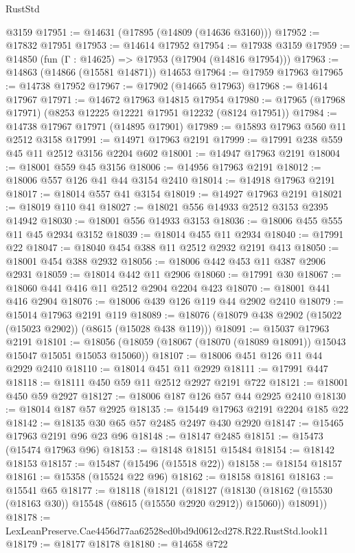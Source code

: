 \begin{lexlean}{RustStd}
\begin{coremodule}
    @3159
@17951 := @14631 (@17895 (@14809 (@14636 @3160)))
@17952 := @17832 @17951
@17953 := @14614 @17952
@17954 := @17938 @3159
@17959 := @14850 (fun (Γ : @14625) => @17953 (@17904 (@14816 @17954)))
@17963 := @14863 (@14866 (@15581 @14871)) @14653
@17964 := @17959 @17963
@17965 := @14738 @17952
@17967 := @17902 (@14665 @17963)
@17968 := @14614 @17967
@17971 := @14672 @17963 @14815 @17954
@17980 := @17965 (@17968 @17971) (@8253 @12225 @12221 @17951 @12232 (@8124 @17951))
@17984 := @14738 @17967 @17971 (@14895 @17901)
@17989 := @15893 @17963 @560 @11 @2512 @3158
@17991 := @14971 @17963 @2191
@17999 := @17991 @238 @559 @45 @11 @2512 @3156 @2204 @602
@18001 := @14947 @17963 @2191
@18004 := @18001 @559 @45 @3156
@18006 := @14956 @17963 @2191
@18012 := @18006 @557 @126 @41 @44 @3154 @2410
@18014 := @14918 @17963 @2191
@18017 := @18014 @557 @41 @3154
@18019 := @14927 @17963 @2191
@18021 := @18019 @110 @41
@18027 := @18021 @556 @14933 @2512 @3153 @2395 @14942
@18030 := @18001 @556 @14933 @3153
@18036 := @18006 @455 @555 @11 @45 @2934 @3152
@18039 := @18014 @455 @11 @2934
@18040 := @17991 @22
@18047 := @18040 @454 @388 @11 @2512 @2932 @2191 @413
@18050 := @18001 @454 @388 @2932
@18056 := @18006 @442 @453 @11 @387 @2906 @2931
@18059 := @18014 @442 @11 @2906
@18060 := @17991 @30
@18067 := @18060 @441 @416 @11 @2512 @2904 @2204 @423
@18070 := @18001 @441 @416 @2904
@18076 := @18006 @439 @126 @119 @44 @2902 @2410
@18079 := @15014 @17963 @2191 @119
@18089 := @18076 (@18079 @438 @2902 (@15022 (@15023 @2902)) (@8615 (@15028 @438 @119)))
@18091 := @15037 @17963 @2191
@18101 := @18056 (@18059 (@18067 (@18070 (@18089 @18091)) @15043 @15047 @15051 @15053 @15060))
@18107 := @18006 @451 @126 @11 @44 @2929 @2410
@18110 := @18014 @451 @11 @2929
@18111 := @17991 @447
@18118 := @18111 @450 @59 @11 @2512 @2927 @2191 @722
@18121 := @18001 @450 @59 @2927
@18127 := @18006 @187 @126 @57 @44 @2925 @2410
@18130 := @18014 @187 @57 @2925
@18135 := @15449 @17963 @2191 @2204 @185 @22
@18142 := @18135 @30 @65 @57 @2485 @2497 @430 @2920
@18147 := @15465 @17963 @2191 @96 @23 @96
@18148 := @18147 @2485
@18151 := @15473 (@15474 @17963 @96)
@18153 := @18148 @18151 @15484
@18154 := @18142 @18153
@18157 := @15487 (@15496 (@15518 @22))
@18158 := @18154 @18157
@18161 := @15358 (@15524 @22 @96)
@18162 := @18158 @18161
@18163 := @15541 @65
@18177 := @18118
    (@18121
      (@18127
        (@18130 (@18162 (@15530 (@18163 @30)) @15548 (@8615 (@15550 @2920 @2912)) @15060))
        @18091))
@18178 := LexLeanPreserve.Cae4456d77aa62528ed0bd9d0612cd278.R22.RustStd.look11
@18179 := @18177 @18178
@18180 := @14658 @722

\end{coremodule}
\end{lexlean}
